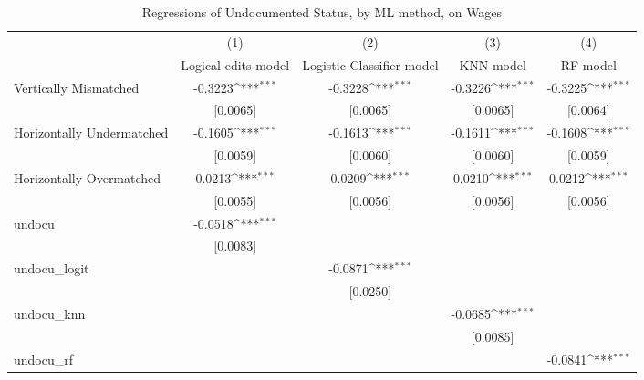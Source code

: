 \begin{table}[htbp]\centering
\def\sym#1{\ifmmode^{#1}\else\(^{#1}\)\fi}
\caption{Regressions of Undocumented Status, by ML method, on Wages}
\begin{tabular}{l*{4}{c}}
\toprule
                    &\multicolumn{1}{c}{(1)}         &\multicolumn{1}{c}{(2)}         &\multicolumn{1}{c}{(3)}         &\multicolumn{1}{c}{(4)}         \\
                    &Logical edits model         &Logistic Classifier model         &   KNN model         &    RF model         \\
\midrule
Vertically Mismatched&     -0.3223\sym{***}&     -0.3228\sym{***}&     -0.3226\sym{***}&     -0.3225\sym{***}\\
                    &    [0.0065]         &    [0.0065]         &    [0.0065]         &    [0.0064]         \\
\addlinespace
Horizontally Undermatched&     -0.1605\sym{***}&     -0.1613\sym{***}&     -0.1611\sym{***}&     -0.1608\sym{***}\\
                    &    [0.0059]         &    [0.0060]         &    [0.0060]         &    [0.0059]         \\
\addlinespace
Horizontally Overmatched&      0.0213\sym{***}&      0.0209\sym{***}&      0.0210\sym{***}&      0.0212\sym{***}\\
                    &    [0.0055]         &    [0.0056]         &    [0.0056]         &    [0.0056]         \\
\addlinespace
undocu              &     -0.0518\sym{***}&                     &                     &                     \\
                    &    [0.0083]         &                     &                     &                     \\
\addlinespace
undocu\_logit        &                     &     -0.0871\sym{***}&                     &                     \\
                    &                     &    [0.0250]         &                     &                     \\
\addlinespace
undocu\_knn          &                     &                     &     -0.0685\sym{***}&                     \\
                    &                     &                     &    [0.0085]         &                     \\
\addlinespace
undocu\_rf           &                     &                     &                     &     -0.0841\sym{***}\\

\end{tabular}
\end{table}
